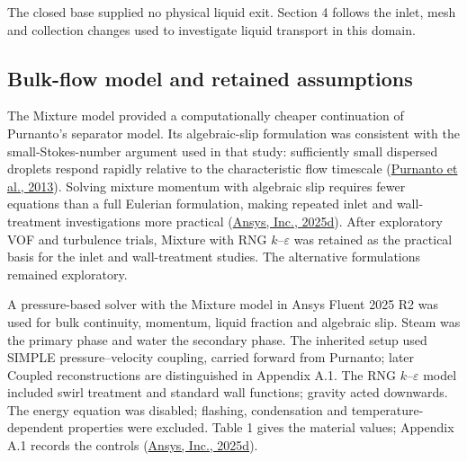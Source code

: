 \documentclass[12pt]{article}
\begin{document}
The closed base supplied no physical liquid exit. Section 4 follows the inlet, mesh and collection changes used to investigate liquid transport in this domain.

\subsection{Bulk-flow model and retained assumptions}\label{bulk-flow-model-and-retained-assumptions}

The Mixture model provided a computationally cheaper continuation of Purnanto's separator model. Its algebraic-slip formulation was consistent with the small-Stokes-number argument used in that study: sufficiently small dispersed droplets respond rapidly relative to the characteristic flow timescale (\href{https://www.researchgate.net/publication/269519626_CFD_MODELLING_OF_TWO-PHASE_FLOW_INSIDE_GEOTHERMAL_STEAM-WATER_SEPARATORS}{Purnanto et al., 2013}). Solving mixture momentum with algebraic slip requires fewer equations than a full Eulerian formulation, making repeated inlet and wall-treatment investigations more practical (\href{https://ansyshelp.ansys.com/public/Views/Secured/corp/v252/en/flu_th/flu_th_sec_drift_oview.html}{Ansys, Inc., 2025d}). After exploratory VOF and turbulence trials, Mixture with RNG \(k\)--\(\varepsilon\) was retained as the practical basis for the inlet and wall-treatment studies. The alternative formulations remained exploratory.

A pressure-based solver with the Mixture model in Ansys Fluent 2025 R2 was used for bulk continuity, momentum, liquid fraction and algebraic slip. Steam was the primary phase and water the secondary phase. The inherited setup used SIMPLE pressure--velocity coupling, carried forward from Purnanto; later Coupled reconstructions are distinguished in Appendix A.1. The RNG \(k\)--\(\varepsilon\) model included swirl treatment and standard wall functions; gravity acted downwards. The energy equation was disabled; flashing, condensation and temperature-dependent properties were excluded. Table 1 gives the material values; Appendix A.1 records the controls (\href{https://ansyshelp.ansys.com/public/Views/Secured/corp/v252/en/flu_th/flu_th_sec_multiphase_mixture.html}{Ansys, Inc., 2025d}).
\end{document}
